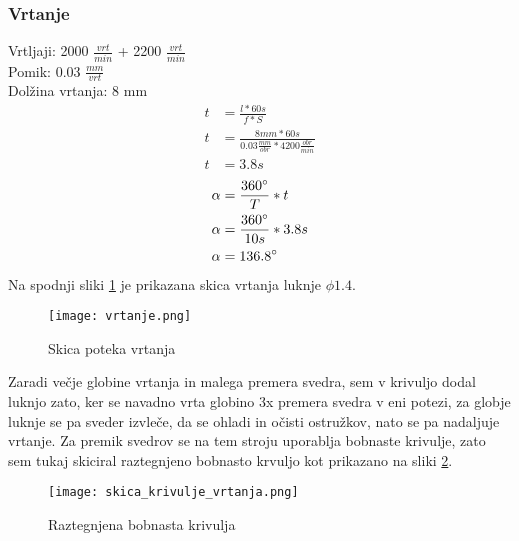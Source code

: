 \subsubsection{Vrtanje}
Vrtljaji: 2000 \( \frac{vrt}{min} \) + 2200 \( \frac{vrt}{min} \)\\
Pomik: 0.03 \( \frac{mm}{vrt} \) \\
Dolžina vrtanja: 8 mm
\begin{equation}
	\begin{split}
		t &= \frac{l*60s}{f*S} \\
		t &= \frac{8mm*60s}{0.03\frac{mm}{obr}*4200\frac{obr}{min}} \\
		t &= 3.8 s
	\end{split}
\end{equation}
\begin{equation}
	\begin{split}
		\alpha &= \frac{360\degree}{T} * t \\
		\alpha &= \frac{360\degree}{10s} * 3.8 s\\
		\alpha &= 136.8\degree
	\end{split}
\end{equation}
Na spodnji sliki \ref{vrtanje} je prikazana skica vrtanja
luknje $\phi 1.4$.
\begin{figure}[H]
	\begin{center}
		\texttt{[image: vrtanje.png]}
		\caption{Skica poteka vrtanja
			\cite{lasten}}
		\label{vrtanje}
	\end{center}
\end{figure}
Zaradi večje globine vrtanja in malega premera svedra,
sem v krivuljo dodal luknjo zato, ker se navadno vrta globino 3x
premera svedra v eni potezi, za globje luknje se pa sveder
izvleče, da se ohladi in očisti ostružkov, nato se pa nadaljuje vrtanje.
Za premik svedrov se na tem stroju uporablja bobnaste krivulje,
zato sem tukaj skiciral raztegnjeno bobnasto krvuljo kot prikazano
na sliki \ref{raztegnjen_boben}.
\begin{figure}[H]
	\begin{center}
		\texttt{[image: skica\_krivulje\_vrtanja.png]}
		\caption{Raztegnjena bobnasta krivulja
			\cite{lasten}}
		\label{raztegnjen_boben}
	\end{center}
\end{figure}
\newpage
